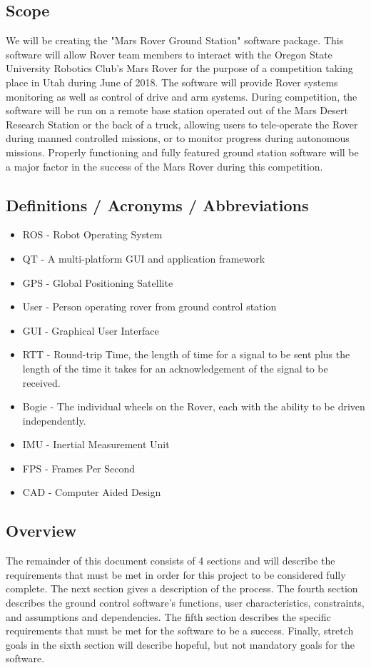 \documentclass[onecolumn, draftclsnofoot, 10pt, compsoc]{IEEEtran}
\begin{document}
\subsection{Scope}
We will be creating the "Mars Rover Ground Station" software package. 
This software will allow Rover team members to interact with the Oregon State University Robotics Club's Mars Rover for the purpose of a competition taking place in Utah during June of 2018. 
The software will provide Rover systems monitoring as well as control of drive and arm systems. 
During competition, the software will be run on a remote base station operated out of the Mars Desert Research Station or the back of a truck, allowing users to tele-operate the Rover during manned controlled missions, or to monitor progress during autonomous missions. 
Properly functioning and fully featured ground station software will be a major factor in the success of the Mars Rover during this competition.


\subsection{Definitions / Acronyms / Abbreviations}
\begin{itemize}
\item ROS - Robot Operating System
\item QT - A multi-platform GUI and application framework
\item GPS - Global Positioning Satellite 
\item User - Person operating rover from ground control station
\item GUI - Graphical User Interface
\item RTT - Round-trip Time, the length of time for a signal to be sent plus the length of the time it takes for an acknowledgement of the signal to be received.
\item Bogie - The individual wheels on the Rover, each with the ability to be driven independently.
\item IMU - Inertial Measurement Unit
\item FPS - Frames Per Second
\item CAD - Computer Aided Design
\end{itemize}


\subsection{Overview}
The remainder of this document consists of 4 sections and will describe the requirements that must be met in order for this project to be considered fully complete. The next section gives a description of the process. 
The fourth section describes the ground control software's functions, user characteristics, constraints, and assumptions and dependencies. 
The fifth section describes the specific requirements that must be met for the software to be a success.
Finally, stretch goals in the sixth section will describe hopeful, but not mandatory goals for the software.
\end{document}
